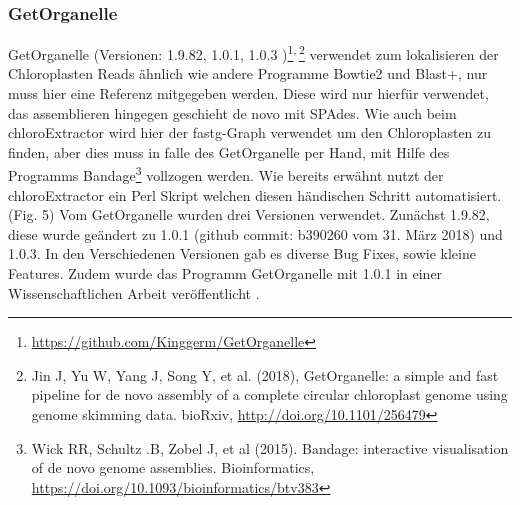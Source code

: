 \documentclass{scrartcl}
\begin{document}
\subsubsection{GetOrganelle}
\label{sec-2-5-5}
GetOrganelle (Versionen: 1.9.82, 1.0.1, 1.0.3 )\footnote{\url{https://github.com/Kinggerm/GetOrganelle}}\textsuperscript{,}\,\footnote{Jin J, Yu W, Yang J, Song Y, et al. (2018), GetOrganelle: a simple and fast pipeline for de novo assembly of a complete circular chloroplast genome using genome skimming data. bioRxiv, \url{http://doi.org/10.1101/256479}} verwendet zum lokalisieren der Chloroplasten Reads ähnlich wie andere Programme Bowtie2 \footnotemark[19]{} und Blast+, nur muss hier eine Referenz mitgegeben werden. 
Diese wird nur hierfür
verwendet, das assemblieren hingegen geschieht de novo mit SPAdes. Wie auch beim chloroExtractor wird hier der fastg-Graph verwendet um den Chloroplasten zu finden, aber dies muss in falle 
des GetOrganelle per Hand, mit Hilfe des Programms Bandage\footnote{Wick RR, Schultz .B, Zobel J, et al (2015). Bandage: interactive visualisation of de novo genome assemblies. Bioinformatics, \url{https://doi.org/10.1093/bioinformatics/btv383}} vollzogen werden. Wie bereits erwähnt nutzt der chloroExtractor ein Perl Skript welchen diesen händischen Schritt automatisiert.(Fig. 5) 
Vom GetOrganelle wurden drei Versionen verwendet. Zunächst 1.9.82, diese wurde geändert zu 1.0.1 (github commit: b390260 vom 31. März 2018) und 1.0.3. In den Verschiedenen Versionen gab es diverse Bug Fixes, sowie
kleine Features.
Zudem wurde das Programm GetOrganelle mit 1.0.1 in einer Wissenschaftlichen Arbeit veröffentlicht \footnotemark[30]{}.
\end{document}
